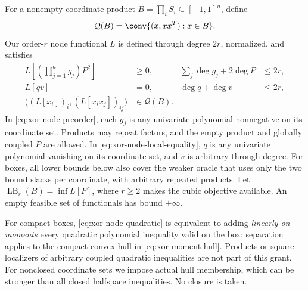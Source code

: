 For a nonempty coordinate product $B=\prod_i S_i\subseteq[-1,1]^n$, define
\begin{equation}\label{eq:xor-moment-hull}
 \mathcal Q(B)=\conv\{(x,xx^T):x\in B\}.
\end{equation}
Our order-$r$ node functional $L$ is defined through degree $2r$, normalized,
and satisfies
\begin{align}
 L\left[\left(\prod_{j=1}^a g_j\right)P^2\right]&\ge0,
 &\sum_j\deg g_j+2\deg P&\le2r,\label{eq:xor-node-preorder}\\
 L[qv]&=0,&\deg q+\deg v&\le2r,\label{eq:xor-node-local-equality}\\
 \bigl((L[x_i])_i,(L[x_ix_j])_{ij}\bigr)&\in\mathcal Q(B).
 &&\label{eq:xor-node-quadratic}
\end{align}
In \eqref{eq:xor-node-preorder}, each $g_j$ is any univariate polynomial
nonnegative on its coordinate set. Products may repeat factors, and the
empty product and globally coupled $P$ are allowed. In
\eqref{eq:xor-node-local-equality}, $q$ is any univariate polynomial
vanishing on its coordinate set, and $v$ is arbitrary through degree.
For boxes, all lower bounds below also cover the weaker oracle that uses
only the two bound slacks per coordinate, with arbitrary repeated products. Let $\operatorname{LB}_r(B)=\inf L[F]$, where $r\ge2$ makes the
cubic objective available. An empty feasible set of functionals has bound
$+\infty$.

For compact boxes, \eqref{eq:xor-node-quadratic} is equivalent to adding
\emph{linearly on moments} every quadratic polynomial inequality valid
on the box: separation applies to the compact convex hull in
\eqref{eq:xor-moment-hull}. Products or square localizers of arbitrary
coupled quadratic inequalities are not part of this grant. For nonclosed
coordinate sets we impose actual hull membership, which can be stronger
than all closed halfspace inequalities. No closure is taken.

